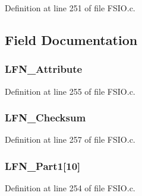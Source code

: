 Definition at line 251 of file F\+S\+I\+O.\+c.



\subsection{Field Documentation}
\hypertarget{struct_l_f_n___e_n_t_r_y_a945202a07480953785c9bd92f968b151}{}
\subsubsection[{L\+F\+N\+\_\+\+Attribute}]{ L\+F\+N\+\_\+\+Attribute}\label{struct_l_f_n___e_n_t_r_y_a945202a07480953785c9bd92f968b151}


Definition at line 255 of file F\+S\+I\+O.\+c.

\hypertarget{struct_l_f_n___e_n_t_r_y_a338f68886f444399176fe379d47f1001}{}
\subsubsection[{L\+F\+N\+\_\+\+Checksum}]{ L\+F\+N\+\_\+\+Checksum}\label{struct_l_f_n___e_n_t_r_y_a338f68886f444399176fe379d47f1001}


Definition at line 257 of file F\+S\+I\+O.\+c.

\hypertarget{struct_l_f_n___e_n_t_r_y_adfce60ac11522b7181f15eefb8d287bd}{}
\subsubsection[{L\+F\+N\+\_\+\+Part1}]{ L\+F\+N\+\_\+\+Part1\mbox{[}10\mbox{]}}\label{struct_l_f_n___e_n_t_r_y_adfce60ac11522b7181f15eefb8d287bd}


Definition at line 254 of file F\+S\+I\+O.\+c.

